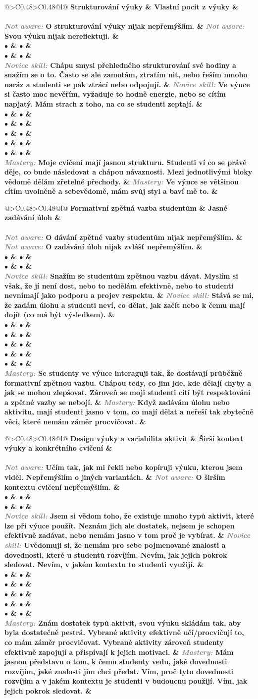 \documentclass[twoside,openany,10pt]{book}
\makeatletter
\newcommand{\note}[1]{\textcolor{gray}{\small\itshape #1}}
\newcommand{\rubricpage}[8]{
\newpage
\begin{tabular}{@{}>{\small}C{0.48\textwidth}>{\small}C{0.48\textwidth}@{}l@{}}
\normalsize \bfseries #1 & \normalsize \bfseries #5 & \\[1em] \hline \\[-1.2em]
	\justify \note{Not aware:} #2 & \justify \note{Not aware:} #6 & \\[2em]
$\bullet$ & $\bullet$ & \\
$\bullet$ & $\bullet$ & \\
\justify \note{Novice skill:} #3 & \justify \note{Novice skill:} #7 & \\[3em]
$\bullet$ & $\bullet$ & \\
$\bullet$ & $\bullet$ & \\
$\bullet$ & $\bullet$ & \\
$\bullet$ & $\bullet$ & \\
$\bullet$ & $\bullet$ & \\
\justify \note{Mastery:} #4 & \justify \note{Mastery:} #8 &
\end{tabular}
}
\makeatother
\begin{document}
\rubricpage{Strukturování výuky}
{O strukturování výuky nijak nepřemýšlím.}
{Chápu smysl přehledného strukturování své hodiny a snažím se o to. Často se ale zamotám, ztratím nit, nebo řeším mnoho naráz a studenti se pak ztrácí nebo odpojují.}
{Moje cvičení mají jasnou strukturu. Studenti ví co se právě děje, co bude následovat a chápou návaznosti. Mezi jednotlivými bloky vědomě dělám zřetelné přechody.}
{Vlastní pocit z výuky}
{Svou výuku nijak nereflektuji.}
{Ve výuce si často moc nevěřím, vyžaduje to hodně energie, nebo se cítím napjatý. Mám strach z toho, na co se studenti zeptají.}
{Ve výuce se většinou cítím uvolněně a sebevědomě, mám svůj styl a baví mě to.}

\rubricpage{Formativní zpětná vazba studentům}
{O dávání zpětné vazby studentům nijak nepřemýšlím.}
{Snažím se studentům zpětnou vazbu dávat. Myslím si však, že jí není dost, nebo to nedělám efektivně, nebo to studenti nevnímají jako podporu a projev respektu.}
{Se studenty ve výuce interaguji tak, že dostávají průběžně formativní zpětnou vazbu. Chápou tedy, co jim jde, kde dělají chyby a jak se mohou zlepšovat. Zároveň se moji studenti cítí být respektováni a zpětné vazby se nebojí.}
{Jasné zadávání úloh}
{O zadávání úloh nijak zvlášť nepřemýšlím.}
{Stává se mi, že zadám úlohu a studenti neví, co dělat, jak začít nebo k čemu mají dojít (co má být výsledkem).}
{Když zadávám úlohu nebo aktivitu, mají studenti jasno v tom, co mají dělat a neřeší tak zbytečně věci, které nemám záměr procvičovat.}

\rubricpage{Design výuky a variabilita aktivit}
{Učím tak, jak mi řekli nebo kopíruji výuku, kterou jsem viděl. Nepřemýšlím o jiných variantách.}
{Jsem si vědom toho, že existuje mnoho typů aktivit, které lze při výuce použít. Neznám jich ale dostatek, nejsem je schopen efektivně zadávat, nebo nemám jasno v tom proč je vybírat.}
{Znám dostatek typů aktivit, svou výuku skládám tak, aby byla dostatečně pestrá. Vybrané aktivity efektivně učí/procvičují to, co mám záměr procvičovat. Vybrané aktivity zároveň studenty efektivně zapojují a přispívají k jejich motivaci.}
{Širší kontext výuky a konkrétního cvičení}
{O širším kontextu cvičení nepřemýšlím.}
{Uvědomuji si, že nemám pro sebe pojmenované znalosti a dovednosti, které u studentů rozvíjím. Nevím, jak jejich pokrok sledovat. Nevím, v jakém kontextu to studenti využijí.}
{Mám jasnou představu o tom, k čemu studenty vedu, jaké dovednosti rozvíjím, jaké znalosti jim chci předat. Vím, proč tyto dovednosti rozvíjím a v jakém kontextu je studenti v budoucnu použijí. Vím, jak jejich pokrok sledovat.}
\vspace*{-1em}
\end{document}
